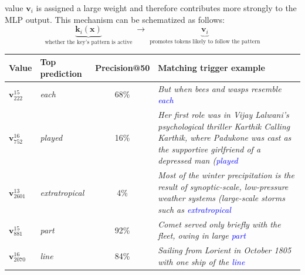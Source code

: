 value \(\mathbf{v}_i\) is assigned a large weight and therefore contributes
more strongly to the MLP output. This mechanism can be schematized as follows:
\[
\boxed{
\underbrace{\mathbf{k}_i(\mathbf{x})}_{
    \text{whether the key's pattern is active}
}
\;\longrightarrow\;
\underbrace{\mathbf{v}_i}_{
    \text{promotes tokens likely to follow the pattern}
}
}
\]
\begin{table}[t]
    \centering
    \small
    \setlength{\tabcolsep}{6pt}
    \renewcommand{\arraystretch}{1.15}

    \begin{tabularx}{\textwidth}{@{} l l c >{\raggedright\arraybackslash}X @{}}
        \toprule
        \textbf{Value}
        & \textbf{Top prediction}
        & \textbf{Precision@50}
        & \textbf{Matching trigger example} \\
        \midrule

        $\mathbf{v}^{15}_{222}$
        & \emph{each}
        & 68\%
        & \emph{But when bees and wasps resemble \textcolor{blue}{each}} \\

        \midrule

        $\mathbf{v}^{16}_{752}$
        & \emph{played}
        & 16\%
        & \emph{Her first role was in Vijay Lalwani's psychological thriller
        Karthik Calling Karthik, where Padukone was cast as the supportive
        girlfriend of a depressed man (\textcolor{blue}{played}} \\

        \midrule

        $\mathbf{v}^{13}_{2601}$
        & \emph{extratropical}
        & 4\%
        & \emph{Most of the winter precipitation is the result of synoptic-scale,
        low-pressure weather systems (large-scale storms such as
        \textcolor{blue}{extratropical}} \\

        \midrule

        $\mathbf{v}^{15}_{881}$
        & \emph{part}
        & 92\%
        & \emph{Comet served only briefly with the fleet, owing in large
        \textcolor{blue}{part}} \\

        \midrule

        $\mathbf{v}^{16}_{2070}$
        & \emph{line}
        & 84\%
        & \emph{Sailing from Lorient in October 1805 with one ship of the
        \textcolor{blue}{line}} \\


\end{tabularx}
\end{table}
